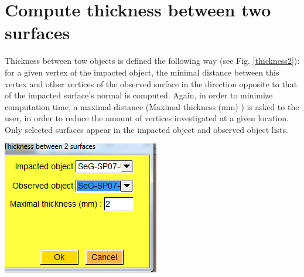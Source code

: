 \section{Compute thickness between two surfaces}

\noindent
\begin{minipage}{0.5\textwidth}
Thickness between tow objects is defined the following way (see Fig. \ref{thickness2}):
for a given vertex of the impacted object, the minimal distance
between this vertex and other vertices of the observed surface in
the direction opposite to that of the impacted surface's normal
is computed. Again, in order to minimize computation time, a
maximal distance (Maximal thickness (mm) ) is asked to the user,
in order to reduce the amount of vertices investigated at a given
location. Only selected surfaces appear in the impacted object
and observed object lists.
\end{minipage}    
\begin{minipage}{0.5\textwidth}\centering
  \includegraphics[scale=0.5]{images/Scalars_renreding/Thickness_window2.png}
\label{thickness_window2}
 \end{minipage} 
\noindent






